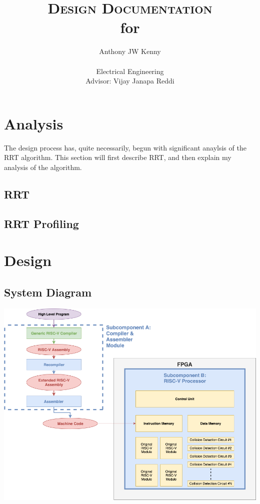 \documentclass[11pt, oneside]{article}      %
\title{\textsc{Design Documentation} \\ 
    \small{for} \\ 
    \Large{\masterThesisTitle}}
\author{Anthony JW Kenny \\ \\
        Electrical Engineering \\
        Advisor: Vijay Janapa Reddi}
\begin{document}
\maketitle







\section{Analysis}
The design process has, quite necessarily, begun with significant anaylsis of the RRT algorithm. This section will first describe RRT, and then explain my analysis of the algorithm.

\subsection{RRT}


\subsection{RRT Profiling}


\section{Design}

\subsection{System Diagram}


\begin{center}
\includegraphics[width=\linewidth]{../master/img/systemDiagramHorizontal.png}
\end{center}
\end{document}

